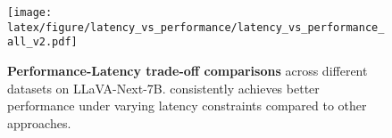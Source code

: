 

\begin{figure*}[!ht]
    \centering
    \texttt{[image: latex/figure/latency\_vs\_performance/latency\_vs\_performance\_all\_v2.pdf]}
    \vspace{-4mm}
    \caption{\textbf{Performance-Latency trade-off comparisons} across different datasets on LLaVA-Next-7B. \algname consistently achieves better performance under varying latency constraints compared to other approaches.}
    \vspace{-4mm}
    \label{fig:latency_vs_performance}
\end{figure*}

